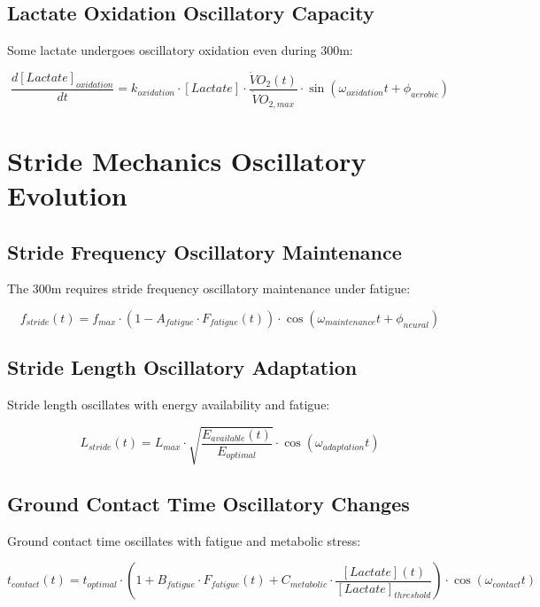 \documentclass[12pt]{article}
\begin{document}
\subsection{Lactate Oxidation Oscillatory Capacity}

Some lactate undergoes oscillatory oxidation even during 300m:

\begin{equation}
\frac{d[Lactate]_{oxidation}}{dt} = k_{oxidation} \cdot [Lactate] \cdot \frac{\dot{V}O_2(t)}{\dot{V}O_{2,max}} \cdot \sin(\omega_{oxidation}t + \phi_{aerobic})
\end{equation}

\section{Stride Mechanics Oscillatory Evolution}

\subsection{Stride Frequency Oscillatory Maintenance}

The 300m requires stride frequency oscillatory maintenance under fatigue:

\begin{equation}
f_{stride}(t) = f_{max} \cdot \left(1 - A_{fatigue} \cdot F_{fatigue}(t)\right) \cdot \cos(\omega_{maintenance}t + \phi_{neural})
\end{equation}

\subsection{Stride Length Oscillatory Adaptation}

Stride length oscillates with energy availability and fatigue:

\begin{equation}
L_{stride}(t) = L_{max} \cdot \sqrt{\frac{E_{available}(t)}{E_{optimal}}} \cdot \cos(\omega_{adaptation}t)
\end{equation}

\subsection{Ground Contact Time Oscillatory Changes}

Ground contact time oscillates with fatigue and metabolic stress:

\begin{equation}
t_{contact}(t) = t_{optimal} \cdot \left(1 + B_{fatigue} \cdot F_{fatigue}(t) + C_{metabolic} \cdot \frac{[Lactate](t)}{[Lactate]_{threshold}}\right) \cdot \cos(\omega_{contact}t)
\end{equation}
\end{document}
